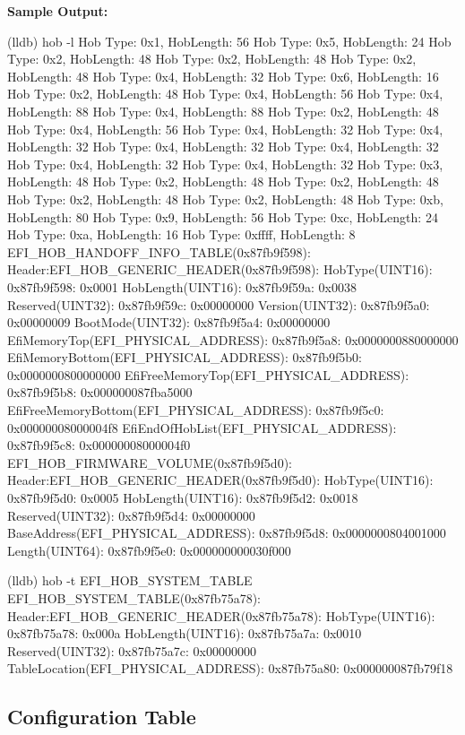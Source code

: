 \textcolor{SmokeyDarkBlue}{\bfseries Sample Output:} \\
\begin{TerminalOutput}
(lldb) hob -l
Hob Type: 0x1, HobLength: 56
Hob Type: 0x5, HobLength: 24
Hob Type: 0x2, HobLength: 48
Hob Type: 0x2, HobLength: 48
Hob Type: 0x2, HobLength: 48
Hob Type: 0x4, HobLength: 32
Hob Type: 0x6, HobLength: 16
Hob Type: 0x2, HobLength: 48
Hob Type: 0x4, HobLength: 56
Hob Type: 0x4, HobLength: 88
Hob Type: 0x4, HobLength: 88
Hob Type: 0x2, HobLength: 48
Hob Type: 0x4, HobLength: 56
Hob Type: 0x4, HobLength: 32
Hob Type: 0x4, HobLength: 32
Hob Type: 0x4, HobLength: 32
Hob Type: 0x4, HobLength: 32
Hob Type: 0x4, HobLength: 32
Hob Type: 0x4, HobLength: 32
Hob Type: 0x3, HobLength: 48
Hob Type: 0x2, HobLength: 48
Hob Type: 0x2, HobLength: 48
Hob Type: 0x2, HobLength: 48
Hob Type: 0x2, HobLength: 48
Hob Type: 0xb, HobLength: 80
Hob Type: 0x9, HobLength: 56
Hob Type: 0xc, HobLength: 24
Hob Type: 0xa, HobLength: 16
Hob Type: 0xffff, HobLength: 8
EFI_HOB_HANDOFF_INFO_TABLE(0x87fb9f598):
	Header:EFI_HOB_GENERIC_HEADER(0x87fb9f598):
		HobType(UINT16):
			0x87fb9f598: 0x0001
		HobLength(UINT16):
			0x87fb9f59a: 0x0038
		Reserved(UINT32):
			0x87fb9f59c: 0x00000000
	Version(UINT32):
		0x87fb9f5a0: 0x00000009
	BootMode(UINT32):
		0x87fb9f5a4: 0x00000000
	EfiMemoryTop(EFI_PHYSICAL_ADDRESS):
		0x87fb9f5a8: 0x0000000880000000
	EfiMemoryBottom(EFI_PHYSICAL_ADDRESS):
		0x87fb9f5b0: 0x0000000800000000
	EfiFreeMemoryTop(EFI_PHYSICAL_ADDRESS):
		0x87fb9f5b8: 0x000000087fba5000
	EfiFreeMemoryBottom(EFI_PHYSICAL_ADDRESS):
		0x87fb9f5c0: 0x00000008000004f8
	EfiEndOfHobList(EFI_PHYSICAL_ADDRESS):
		0x87fb9f5c8: 0x00000008000004f0
EFI_HOB_FIRMWARE_VOLUME(0x87fb9f5d0):
	Header:EFI_HOB_GENERIC_HEADER(0x87fb9f5d0):
		HobType(UINT16):
			0x87fb9f5d0: 0x0005
		HobLength(UINT16):
			0x87fb9f5d2: 0x0018
		Reserved(UINT32):
			0x87fb9f5d4: 0x00000000
	BaseAddress(EFI_PHYSICAL_ADDRESS):
		0x87fb9f5d8: 0x0000000804001000
	Length(UINT64):
		0x87fb9f5e0: 0x000000000030f000


(lldb) hob -t EFI_HOB_SYSTEM_TABLE
EFI_HOB_SYSTEM_TABLE(0x87fb75a78):
	Header:EFI_HOB_GENERIC_HEADER(0x87fb75a78):
		HobType(UINT16):
			0x87fb75a78: 0x000a
		HobLength(UINT16):
			0x87fb75a7a: 0x0010
		Reserved(UINT32):
			0x87fb75a7c: 0x00000000
	TableLocation(EFI_PHYSICAL_ADDRESS):
		0x87fb75a80: 0x000000087fb79f18
\end{TerminalOutput}

\subsection{Configuration Table}

